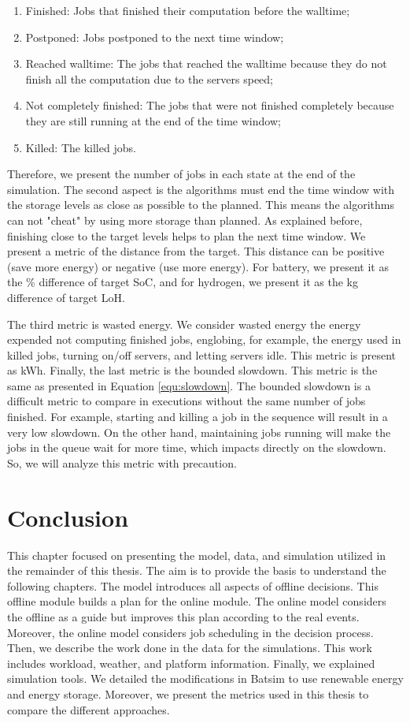 \begin{enumerate}
    \item Finished: Jobs that finished their computation before the walltime;
    \item Postponed: Jobs postponed to the next time window;
    \item Reached walltime: The jobs that reached the walltime because they do not finish all the computation due to the servers speed;
    \item Not completely finished: The jobs that were not finished completely because they are still running at the end of the time window;
    \item Killed: The killed jobs.
\end{enumerate} 

Therefore, we present the number of jobs in each state at the end of the simulation. The second aspect is the algorithms must end the time window with the storage levels as close as possible to the planned. This means the algorithms can not "cheat" by using more storage than planned. As explained before, finishing close to the target levels helps to plan the next time window. We present a metric of the distance from the target. This distance can be positive (save more energy) or negative (use more energy). For battery, we present it as the \% difference of target SoC, and for hydrogen, we present it as the kg difference of target LoH.

The third metric is wasted energy. We consider wasted energy the energy expended not computing finished jobs, englobing, for example, the energy used in killed jobs, turning on/off servers, and letting servers idle. This metric is present as kWh. Finally, the last metric is the bounded slowdown. This metric is the same as presented in Equation \ref{equ:slowdown}. The bounded slowdown is a difficult metric to compare in executions without the same number of jobs finished. For example, starting and killing a job in the sequence will result in a very low slowdown. On the other hand, maintaining jobs running will make the jobs in the queue wait for more time, which impacts directly on the slowdown. So, we will analyze this metric with precaution.

\section{Conclusion}
This chapter focused on presenting the model, data, and simulation utilized in the remainder of this thesis. The aim is to provide the basis to understand the following chapters. The model introduces all aspects of offline decisions. This offline module builds a plan for the online module. The online model considers the offline as a guide but improves this plan according to the real events. Moreover, the online model considers job scheduling in the decision process. Then, we describe the work done in the data for the simulations. This work includes workload, weather, and platform information. Finally, we explained simulation tools. We detailed the modifications in Batsim to use renewable energy and energy storage. Moreover, we present the metrics used in this thesis to compare the different approaches.